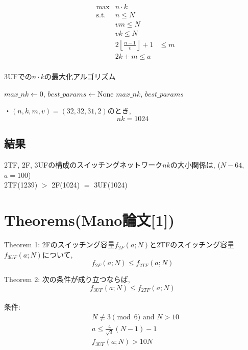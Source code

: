 \documentclass[11pt, a4paper]{jarticle}
\begin{document}
\begin{align}
    & \max  &n \cdot k \\
    & \text{s.t.} & n \leq N \\
    && v m \leq N\\
    && v k \leq N \\
    && 2 \left\lfloor \frac{n-1}{v} \right\rfloor + 1 &\leq m \\
    && 2k + m \leq a\\
\end{align}

\begin{algorithm}[H]
    \caption{3UFでの$n \cdot k$の最大化アルゴリズム}
    $max\_nk \gets 0$, $best\_params \gets \text{None}$\;
    \Return $max\_nk$, $best\_params$\;
\end{algorithm}


・$(n, k, m, v) = (32, 32, 31, 2)$のとき, $$nk=1024$$

\subsection{結果}
\noindent 2TF, 2F, 3UFの構成のスイッチングネットワーク$nk$の大小関係は, ($N-64$, $a=100$)\\
2TF(1239) $>$ 2F(1024) $=$ 3UF(1024)

\section{Theorems(Mano論文[1])}
Theorem 1: 2Fのスイッチング容量$f_{2F}(a; N)$と2TFのスイッチング容量$f_{3UF}(a; N)$について, \\
$$f_{2F}(a; N) \leq f_{2TF}(a; N)$$

Theorem 2: 次の条件が成り立つならば, $$f_{3UF}(a; N) \leq f_{2TF}(a; N)$$ \\
条件: 
\begin{align}
    &N \not\equiv 3 \pmod{6} \text{ and } N > 10\\
    &a \leq \frac{4}{\sqrt{3}}(N-1)-1\\
    & f_{3UF}(a; N) > 10N
\end{align}
\end{document}
